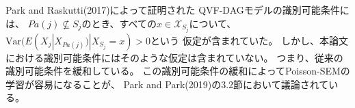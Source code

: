 Park and Raskutti(2017)\cite{Park2017-hw}によって証明された
QVF-DAGモデルの識別可能条件には、
$Pa(j) \nsubseteq S_j$のとき、すべての$x \in \mathcal X_{S_j}$について、
$\mathrm{Var}(E(X_j | X_{Pa(j)}) | X_{S_j} = x) > 0$という
仮定が含まれていた。
しかし、本論文における識別可能条件にはそのような仮定は含まれていない。
つまり、従来の識別可能条件\cite{Park2017-hw}を緩和している。
この識別可能条件の緩和によってPoisson-SEMの学習が容易になることが、
Park and Park(2019)\cite{Park2019-qy}の3.2節において議論されている。
